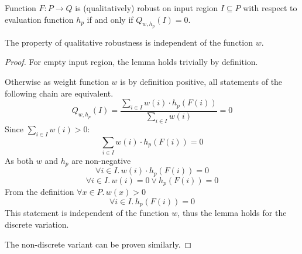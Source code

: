 \begin{definition}
    Function $F : P\to Q$ is (qualitatively) robust on input region $I\subseteq P$
    with respect to evaluation function $h_p$
    if and only if $Q_{w, h_p}(I) = 0$.
\end{definition}

\begin{lemma}{The property of qualitative robustness is independent of the function $w$.}%
    \label{lemma:robustness_independence_of_weight}
    \begin{proof}
        For empty input region, the lemma holds trivially by definition.

        Otherwise as weight function $w$ is by definition positive,
        all statements of the following chain are equivalent.
        \begin{equation*}
            Q_{w, h_p}(I) = \frac{\sum_{i\in I} w(i)\cdot h_p(F(i))}{\sum_{i\in I} w(i)} = 0
        \end{equation*}
        Since $\sum_{i\in I} w(i) > 0$:
        \begin{equation*}
            \sum_{i\in I} w(i)\cdot h_p(F(i)) = 0
        \end{equation*}
        As both $w$ and $h_p$ are non-negative
        \begin{equation*}
            \forall i\in I. \, w(i)\cdot h_p(F(i)) = 0
        \end{equation*}
        \begin{equation*}
            \forall i\in I. \, w(i) = 0 \vee h_p(F(i)) = 0
        \end{equation*}
        From the definition $\forall x\in P.\, w(x) > 0$
        \begin{equation*}
            \forall i\in I. \, h_p(F(i)) = 0
        \end{equation*}
        This statement is independent of the function $w$,
        thus the lemma holds for the discrete variation.

        The non-discrete variant can be proven similarly.
    \end{proof}
\end{lemma}

